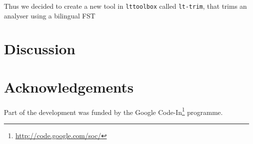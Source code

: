 \documentclass[11pt]{article}
\begin{document}
Thus we decided to create a new tool in \texttt{lttoolbox} called
\texttt{lt-trim}, that trims an analyser using a bilingual FST

\section{Discussion}
\section*{Acknowledgements}
Part of the development was funded by the Google
Code-In\footnote{\href{http://code.google.com/soc/}{http://code.google.com/soc/}
} programme.




\end{document}
